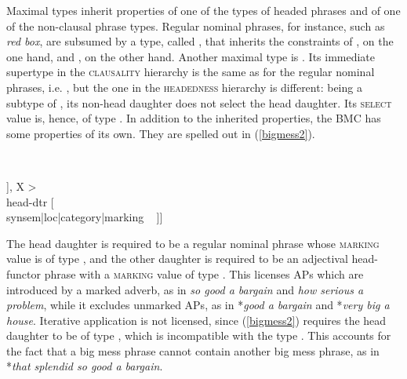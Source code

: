 \documentclass[output=paper
	        ,collection
	        ,collectionchapter
 	        ,biblatex
                ,babelshorthands
                ,newtxmath
                ,draftmode
                ,colorlinks, citecolor=brown
]{langscibook}
\begin{document}
Maximal types inherit properties of one of the types of headed phrases
and of one of the non-clausal phrase types.  
Regular nominal phrases, for instance, such as \emph{red box}, are subsumed 
by a type, called , that inherits the 
constraints of , on the one hand, and 
, on the other hand.  
Another maximal type is . 
Its immediate supertype in the \textsc{clausality} hierarchy is the same 
as for the regular nominal phrases, i.e. , 
but the one in the \textsc{headedness} hierarchy is different: 
being a subtype of , 
its non-head daughter does not select the head daughter. Its \textsc{select} 
value is, hence, of type . 
In addition to the inherited properties, the BMC has some properties of its own.   
They are spelled out in (\ref{bigmess2}).

\begin{exe}
\ex\label{bigmess2} 
 ~ \impl ~ 
\begin{avm}
 [ dtrs ~ <[\type{head-functor-phrase}                           \\
            synsem|loc|category [head    & \type{adjective}      \\
                                 marking & \type{marked}]], X > \\
 head-dtr [                         \\
           synsem|loc|category|marking ~ ]]
\end{avm}
\end{exe}

\noindent
The head daughter is required to be a regular nominal phrase 
whose \textsc{marking} value is of type , and the other daughter 
is required to be an adjectival head-functor phrase
with a \textsc{marking} value of type . 
This licenses APs which are introduced by a marked adverb, 
as in \emph{so good a bargain} and \emph{how serious a problem}, 
while it excludes unmarked APs, as in 
*\emph{good a bargain} and *\emph{very big a house}.
Iterative application is not licensed, since (\ref{bigmess2}) requires the 
head daughter to be of type , which is incompatible with the type 
. This accounts for the fact that a big
mess phrase cannot contain another big mess phrase, as in
*\emph{that splendid so good a bargain}.
\end{document}
